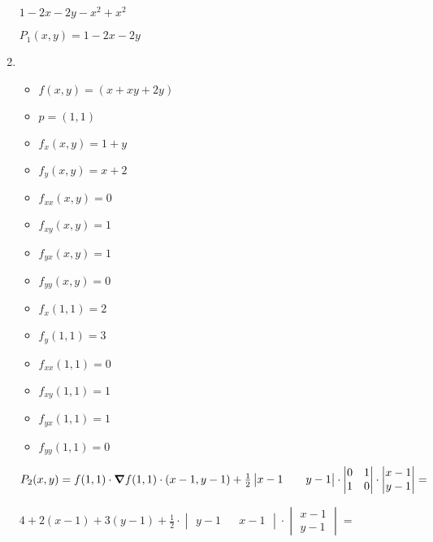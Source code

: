 \documentclass[../practica_05.tex]{subfiles}
\begin{document}
\begin{enumerate}
            $ 1 - 2x - 2y -x^2 + x^2$

            $P_1(x,y) = 1 - 2x - 2y$

        \item 
            \begin{itemize}
                \item $f(x,y) = (x+xy+2y)$
                \item $p = (1,1)$
            \end{itemize}

            \begin{itemize}
                \item $f_{x}(x,y) = 1 + y $
                \item $f_{y}(x,y) = x + 2 $
                \item $f_{xx}(x,y) = 0 $
                \item $f_{xy}(x,y) = 1 $
                \item $f_{yx}(x,y) = 1 $
                \item $f_{yy}(x,y) = 0 $
            \end{itemize}

            \begin{itemize}
                \item $f_{x}(1,1) = 2 $
                \item $f_{y}(1,1) = 3 $
                \item $f_{xx}(1,1) = 0 $
                \item $f_{xy}(1,1) = 1 $
                \item $f_{yx}(1,1) = 1 $
                \item $f_{yy}(1,1) = 0 $
            \end{itemize}

            $P_2(x,y) = f(1,1) \cdot \grad f(1,1)\cdot(x-1,y-1) + \frac{1}{2} \begin{vmatrix}
                x-1 && y-1
            \end{vmatrix} \cdot \begin{vmatrix}
                0 & 1 \\
                1 & 0
            \end{vmatrix} \cdot \begin{vmatrix}
                x-1 \\
                y-1   
            \end{vmatrix} = $

            $ 4 + 2(x-1) + 3(y-1) + \frac{1}{2} \cdot \begin{vmatrix}
                y-1 && x-1
            \end{vmatrix} \cdot \begin{vmatrix}
                x-1 \\
                y-1
            \end{vmatrix} = $


\end{enumerate}
\end{document}
